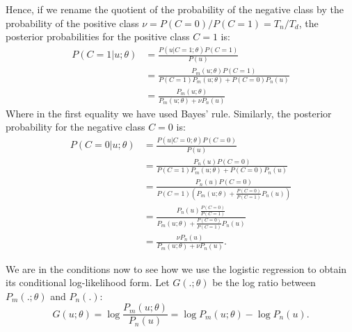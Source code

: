 Hence, if we rename the quotient of the probability of the negative class by the probability of the positive class $\nu = P(C = 0)/P(C = 1) =  T_n/T_d$, the posterior probabilities for the positive class $C = 1$ is:
\begin{align*}
P(C=1|u;\theta) & = \frac{P(u|C=1;\theta)P(C=1)}{P(u)} \\
& = \frac{P_m(u;\theta)P(C = 1)}{P(C = 1) P_m(u; \theta) + P(C = 0)P_n(u)} \\
& = \frac{P_m(u;\theta)}{P_m(u;\theta) + \nu P_n(u)}
\end{align*}
Where in the first equality we have used Bayes' rule. Similarly, the posterior probability for the negative class $C = 0$ is:
\begin{align*}
P(C = 0|u; \theta) & = \frac{P(u|C = 0; \theta) P(C = 0)}{P(u)}\\
& = \frac{P_n(u) P(C = 0)}{P(C = 1) P_m(u; \theta) + P(C = 0)P_n(u)}\\
& = \frac{P_n(u) P(C = 0)}{P(C = 1) \left( P_m(u; \theta) + \frac{P(C = 0)}{P(C = 1)}P_n(u) \right)} \\
& = \frac{P_n(u) \frac{P(C = 0)}{P(C = 1)}}{  P_m(u; \theta) + \frac{P(C = 0)}{P(C = 1)}P_n(u)}\\
& =  \frac{\nu P_n(u)}{P_m(u;\theta) + \nu P_n(u)}.
\end{align*}

We are in the conditions now to see how we use the logistic regression to obtain its conditional log-likelihood form.
Let $G(.;\theta)$ be the log ratio between $P_m(.;\theta)$ and $P_n(.)$:
\begin{equation}\label{log:ratio:G}
G(u;\theta) = \log \frac{P_m(u;\theta)}{P_n(u)} =\log P_m(u;\theta) - \log P_n(u).
\end{equation}

